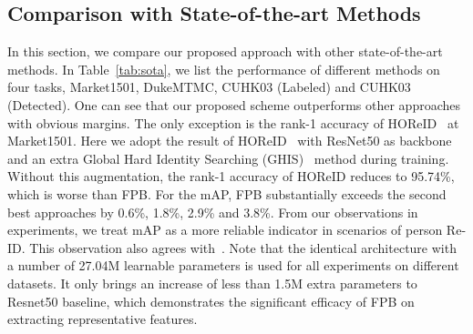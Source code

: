 \documentclass[journal]{IEEEtran}
\begin{document}
\subsection{Comparison with State-of-the-art Methods}
In this section, we compare our proposed approach with other state-of-the-art methods. 
In Table~\ref{tab:sota}, we list the performance of different methods on four tasks, Market1501, DukeMTMC, CUHK03 (Labeled) and CUHK03 (Detected).
One can see that our proposed scheme outperforms other approaches with obvious margins.
The only exception is the rank-1 accuracy of HOReID~\cite{9351775} at Market1501.
Here we adopt the result of HOReID~\cite{9351775} with ResNet50 as backbone and an extra Global Hard Identity Searching (GHIS)~\cite{zhang2019learning} method during training.
Without this augmentation, the rank-1 accuracy of HOReID reduces to 95.74\%, which is worse than FPB.
For the mAP, FPB substantially exceeds the second best approaches by 0.6\%, 1.8\%, 2.9\% and 3.8\%.
From our observations in experiments, we treat mAP as a more reliable indicator in scenarios of person Re-ID.
This observation also agrees with~\cite{chen2019ABD}.
Note that the identical architecture with a number of 27.04M learnable parameters is used for all experiments on different datasets.
It only brings an increase of less than 1.5M extra parameters to Resnet50 baseline, which demonstrates the significant efficacy of FPB on extracting representative features.
\end{document}

